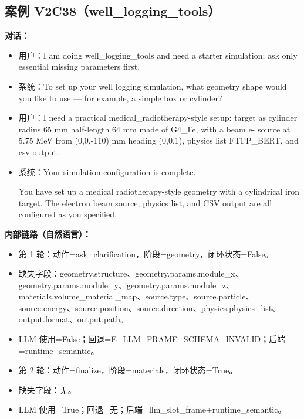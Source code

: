 \documentclass[11pt]{ctexart}
\begin{document}
\subsection{案例 V2C38（well\_logging\_tools）}
\textbf{对话：}
\begin{itemize}
\item 用户：I am doing well\_logging\_tools and need a starter simulation; ask only essential missing parameters first.
\item 系统：To set up your well logging simulation, what geometry shape would you like to use — for example, a simple box or cylinder?
\item 用户：I need a practical medical\_radiotherapy-style setup: target as cylinder radius 65 mm half-length 64 mm made of G4\_Fe, with a beam e- source at 5.75 MeV from (0,0,-110) mm heading (0,0,1), physics list FTFP\_BERT, and csv output.
\item 系统：Your simulation configuration is complete.

You have set up a medical radiotherapy-style geometry with a cylindrical iron target. The electron beam source, physics list, and CSV output are all configured as you specified.
\end{itemize}
\textbf{内部链路（自然语言）：}
\begin{itemize}
\item 第 1 轮：动作=ask\_clarification，阶段=geometry，闭环状态=False。
\item 缺失字段：geometry.structure、geometry.params.module\_x、geometry.params.module\_y、geometry.params.module\_z、materials.volume\_material\_map、source.type、source.particle、source.energy、source.position、source.direction、physics.physics\_list、output.format、output.path。
\item LLM 使用=False；回退=E\_LLM\_FRAME\_SCHEMA\_INVALID；后端=runtime\_semantic。
\item 第 2 轮：动作=finalize，阶段=materials，闭环状态=True。
\item 缺失字段：无。
\item LLM 使用=True；回退=无；后端=llm\_slot\_frame+runtime\_semantic。
\end{itemize}
\end{document}
